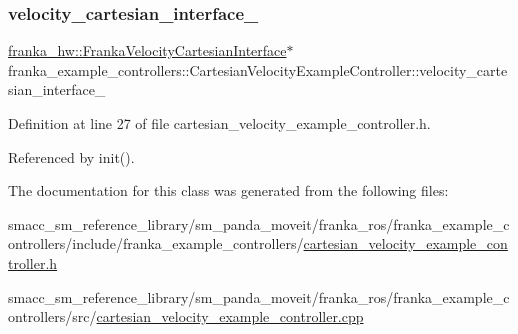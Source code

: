 \subsubsection{\texorpdfstring{velocity\+\_\+cartesian\+\_\+interface\+\_\+}{velocity\_cartesian\_interface\_}}
{\footnotesize\ttfamily \hyperlink{classfranka__hw_1_1FrankaVelocityCartesianInterface}{franka\+\_\+hw\+::\+Franka\+Velocity\+Cartesian\+Interface}$\ast$ franka\+\_\+example\+\_\+controllers\+::\+Cartesian\+Velocity\+Example\+Controller\+::velocity\+\_\+cartesian\+\_\+interface\+\_\+\hspace{0.3cm}{\ttfamily [private]}}



Definition at line 27 of file cartesian\+\_\+velocity\+\_\+example\+\_\+controller.\+h.



Referenced by init().



The documentation for this class was generated from the following files\+:\begin{DoxyCompactItemize}
\item 
smacc\+\_\+sm\+\_\+reference\+\_\+library/sm\+\_\+panda\+\_\+moveit/franka\+\_\+ros/franka\+\_\+example\+\_\+controllers/include/franka\+\_\+example\+\_\+controllers/\hyperlink{cartesian__velocity__example__controller_8h}{cartesian\+\_\+velocity\+\_\+example\+\_\+controller.\+h}\item 
smacc\+\_\+sm\+\_\+reference\+\_\+library/sm\+\_\+panda\+\_\+moveit/franka\+\_\+ros/franka\+\_\+example\+\_\+controllers/src/\hyperlink{cartesian__velocity__example__controller_8cpp}{cartesian\+\_\+velocity\+\_\+example\+\_\+controller.\+cpp}\end{DoxyCompactItemize}
